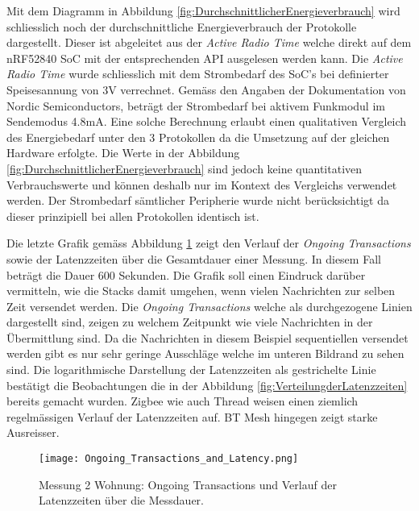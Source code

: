 Mit dem Diagramm in Abbildung \ref{fig:DurchschnittlicherEnergieverbrauch} wird schliesslich noch der durchschnittliche Energieverbrauch der Protokolle dargestellt.
Dieser ist abgeleitet aus der \textit{Active Radio Time} welche direkt auf dem nRF52840 SoC mit der entsprechenden API ausgelesen werden kann.
Die \textit{Active Radio Time} wurde schliesslich mit dem Strombedarf des SoC's bei definierter Speisesannung von 3V verrechnet.
Gemäss den Angaben der Dokumentation von Nordic Semiconductors, beträgt der Strombedarf bei aktivem Funkmodul im Sendemodus 4.8mA.
Eine solche Berechnung erlaubt einen qualitativen Vergleich des Energiebedarf unter den 3 Protokollen da die Umsetzung auf der gleichen Hardware erfolgte.
Die Werte in der Abbildung \ref{fig:DurchschnittlicherEnergieverbrauch} sind jedoch keine quantitativen Verbrauchswerte und können deshalb nur im Kontext des Vergleichs verwendet werden.
Der Strombedarf sämtlicher Peripherie wurde nicht berücksichtigt da dieser prinzipiell bei allen Protokollen identisch ist.

\newpage
Die letzte Grafik gemäss Abbildung \ref{fig:OngoingTransactions} zeigt den Verlauf der \textit{Ongoing Transactions} sowie der Latenzzeiten über die Gesamtdauer einer Messung.
In diesem Fall beträgt die Dauer 600 Sekunden.
Die Grafik soll einen Eindruck darüber vermitteln, wie die Stacks damit umgehen, wenn vielen Nachrichten zur selben Zeit versendet werden.
Die \textit{Ongoing Transactions} welche als durchgezogene Linien dargestellt sind, zeigen zu welchem Zeitpunkt wie viele Nachrichten in der Übermittlung sind.
Da die Nachrichten in diesem Beispiel sequentiellen versendet werden gibt es nur sehr geringe Ausschläge welche im unteren Bildrand zu sehen sind.
Die logarithmische Darstellung der Latenzzeiten als gestrichelte Linie bestätigt die Beobachtungen die in der Abbildung \ref{fig:VerteilungderLatenzzeiten} bereits gemacht wurden.
Zigbee wie auch Thread weisen einen ziemlich regelmässigen Verlauf der Latenzzeiten auf.
BT Mesh hingegen zeigt starke Ausreisser.

\begin{figure}[H]
	\centering
	\texttt{[image: Ongoing\_Transactions\_and\_Latency.png]}
	\caption{Messung 2 Wohnung: Ongoing Transactions und Verlauf der Latenzzeiten über die Messdauer.}
	\label{fig:OngoingTransactions}
\end{figure}